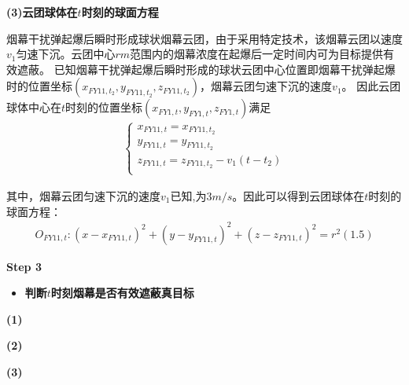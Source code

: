 \documentclass[../main.tex]{subfiles}
\begin{document}
\noindent \textbf{(3)云团球体在$t$时刻的球面方程 }
\par 烟幕干扰弹起爆后瞬时形成球状烟幕云团，由于采用特定技术，该烟幕云团以速度$v_1$匀速下沉。云团中心$rm$范围内的烟幕浓度在起爆后一定时间内可为目标提供有效遮蔽。
已知烟幕干扰弹起爆后瞬时形成的球状云团中心位置即烟幕干扰弹起爆时的位置坐标$\left( x_{FY11,t_2},y_{FY11,t_2},z_{FY11,t_2} \right)$，烟幕云团匀速下沉的速度$v_1$。
因此云团球体中心在$t$时刻的位置坐标$(x_{FY1,t}, y_{FY1,{t}}, z_{FY1,{t}})$满足
\begin{align}\label{1.10}
\left\{ \begin{array}{l}
	x_{FY11,t}=x_{FY11,t_2}\\
	y_{FY11,t}=y_{FY11,t_2}\\
	z_{FY11,t}=z_{FY11,t_2}-v_1\left( t-t_2 \right)\\
\end{array} \right. 
\end{align}
\par 其中，烟幕云团匀速下沉的速度$v_1$已知,为$3m/s$。因此可以得到云团球体在$t$时刻的球面方程：
\begin{align}\label{1.11}
O_{FY11,t}:\left( x-x_{FY11,t} \right) ^2+\left( y-y_{FY11,t} \right) ^2+\left( z-z_{FY11,t} \right) ^2=r^2\left( 1.5 \right) 
\end{align}


\textbf{Step 3 }
\begin{itemize}
\item \textbf{判断$t$时刻烟幕是否有效遮蔽真目标}
\end{itemize}
\par \textbf{(1) }
\par \textbf{(2) }
\par \textbf{(3) }
\end{document}
